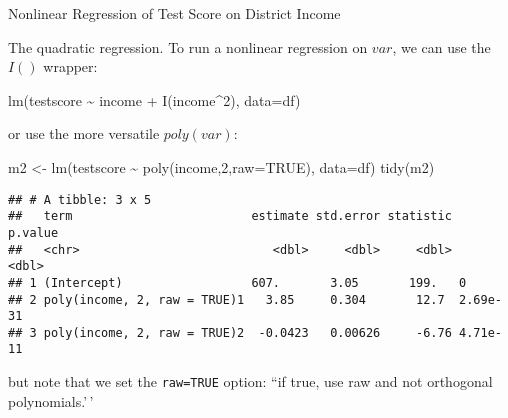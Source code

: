 \documentclass[
  10pt,
  ignorenonframetext,
  t, svgnames, handout]{beamer}
\newenvironment{Shaded}{\begin{snugshade}}{\end{snugshade}}
\newcommand{\AttributeTok}[1]{\textcolor[rgb]{0.77,0.63,0.00}{#1}}
\newcommand{\ConstantTok}[1]{\textcolor[rgb]{0.00,0.00,0.00}{#1}}
\newcommand{\DecValTok}[1]{\textcolor[rgb]{0.00,0.00,0.81}{#1}}
\newcommand{\FunctionTok}[1]{\textcolor[rgb]{0.00,0.00,0.00}{#1}}
\newcommand{\NormalTok}[1]{#1}
\newcommand{\OtherTok}[1]{\textcolor[rgb]{0.56,0.35,0.01}{#1}}
\newcommand{\SpecialCharTok}[1]{\textcolor[rgb]{0.00,0.00,0.00}{#1}}
\begin{document}
\begin{frame}[fragile]{Nonlinear Regression of Test Score on District
Income}
\protect\hypertarget{nonlinear-regression-of-test-score-on-district-income}{}
\begin{block}{The quadratic regression.}
\protect\hypertarget{the-quadratic-regression.}{}
To run a nonlinear regression on \(var\), we can use the \(I()\)
wrapper:

\scriptsize

\begin{Shaded}
\begin{Highlighting}[]
\FunctionTok{lm}\NormalTok{(testscore }\SpecialCharTok{\textasciitilde{}}\NormalTok{ income }\SpecialCharTok{+} \FunctionTok{I}\NormalTok{(income}\SpecialCharTok{\^{}}\DecValTok{2}\NormalTok{), }\AttributeTok{data=}\NormalTok{df)}
\end{Highlighting}
\end{Shaded}

\normalsize or use the more versatile \(poly(var)\):

\scriptsize

\begin{Shaded}
\begin{Highlighting}[]
\NormalTok{m2 }\OtherTok{\textless{}{-}} \FunctionTok{lm}\NormalTok{(testscore }\SpecialCharTok{\textasciitilde{}} \FunctionTok{poly}\NormalTok{(income,}\DecValTok{2}\NormalTok{,}\AttributeTok{raw=}\ConstantTok{TRUE}\NormalTok{), }\AttributeTok{data=}\NormalTok{df)}
\FunctionTok{tidy}\NormalTok{(m2)}
\end{Highlighting}
\end{Shaded}

\begin{verbatim}
## # A tibble: 3 x 5
##   term                         estimate std.error statistic  p.value
##   <chr>                           <dbl>     <dbl>     <dbl>    <dbl>
## 1 (Intercept)                  607.       3.05       199.   0       
## 2 poly(income, 2, raw = TRUE)1   3.85     0.304       12.7  2.69e-31
## 3 poly(income, 2, raw = TRUE)2  -0.0423   0.00626     -6.76 4.71e-11
\end{verbatim}

\normalsize but note that we set the \texttt{raw=TRUE} option: ``if
true, use raw and not orthogonal polynomials.'\,'
\end{block}
\end{frame}
\end{document}
